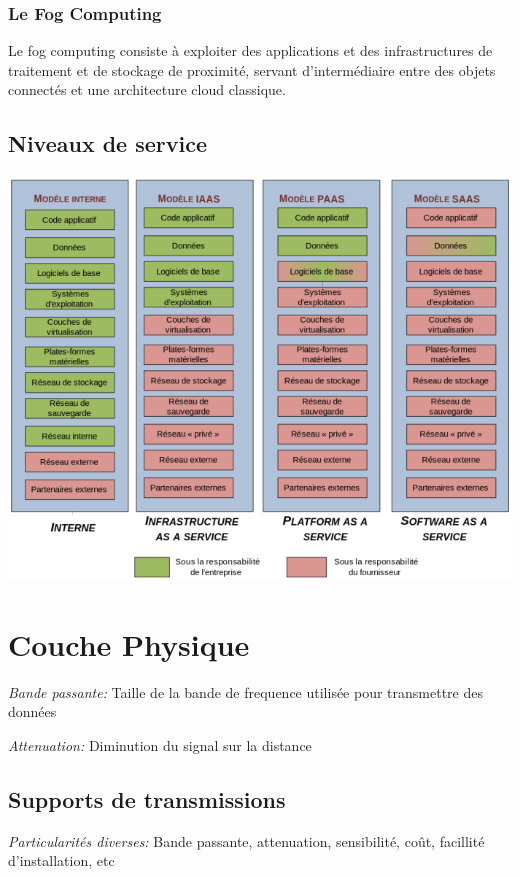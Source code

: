 \documentclass[a4paper, 12pt, french]{article}
\begin{document}
	\subsubsection{Le Fog Computing}

	Le fog computing consiste à exploiter des applications et des infrastructures de traitement et de stockage de proximité, servant d'intermédiaire entre des objets connectés et une architecture cloud classique.

	\subsection{Niveaux de service}

	\includegraphics[width=13.8cm]{reseau_niveaux_de_service}

	\section{Couche Physique}

	\emph{Bande passante:} Taille de la bande de frequence utilisée pour transmettre des données

	\emph{Attenuation: } Diminution du signal sur la distance

	\subsection{Supports de transmissions}

	\emph{Particularités diverses: } Bande passante, attenuation, sensibilité, coût, facillité d'installation, etc
\end{document}
